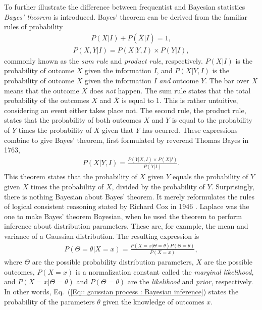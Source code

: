 \documentclass[twoside,english]{uiofysmaster}
\begin{document}
To further illustrate the difference between frequentist and Bayesian statistics \textit{Bayes' theorem} is introduced. Bayes' theorem can be derived from the familiar rules of probability
\begin{align}\label{Eq:: Sum rule}
P(X | I) + P(\bar{X} | I) = 1,
\end{align}
\begin{align}\label{Eq:: Product rule}
P(X, Y | I) = P(X | Y, I) \times P(Y | I),
\end{align} 
commonly known as the \textit{sum rule} and \textit{product rule}, respectively. $P(X|I)$ is the probability of outcome $X$ given the information $I$, and $P(X|Y,I)$ is the probability of outcome $X$ given the information $I$ \textit{and} outcome $Y$. The bar over $\bar{X}$ means that the outcome $X$ does \textit{not} happen. The sum rule states that the total probability of the outcomes $X$ and $\bar{X}$ is equal to 1. This is rather untuitive, considering an event either takes place not. The second rule, the product rule, states that the probability of both outcomes $X$ and $Y$ is equal to the probability of $Y$ times the probability of $X$ given that $Y$ has ocurred. These expressions combine to give Bayes' theorem, first formulated by reverend Thomas Bayes in 1763,
\begin{align}\label{Eq:: gaussian process : Bayes theorem}
P(X | Y, I) = \frac{P(Y | X, I) \times P(X | I)}{P(Y | I)}.
\end{align}
This theorem states that the probability of $X$ given $Y$ equals the probability of $Y$ given $X$ times the probability of $X$, divided by the probability of $Y$. Surprisingly, there is nothing Bayesian about Bayes' theorem. It merely reformulates the rules of logical consistent reasoning stated by Richard Cox in 1946 \cite{sivia2006data}. Laplace was the one to make Bayes' theorem Bayesian, when he used the theorem to perform inference about distribution parameters. These are, for example, the mean and variance of a Gaussian distribution. The resulting expression is
\begin{align}
P(\Theta = \theta | X=x) = \frac{P(X=x|\Theta = \theta) P(\Theta = \theta)}{P(X=x)},\label{Eq:: gaussian process : Bayesian inference}
\end{align}
where $\Theta$ are the possible probability distribution parameters, $X$ are the possible outcomes, $P(X=x)$ is a normalization constant called the \textit{marginal likelihood}, and $P(X=x|\Theta = \theta)$  and $P(\Theta = \theta)$ are the \textit{likelihood} and \textit{prior}, respectively. In other words, Eq.\ (\ref{Eq:: gaussian process : Bayesian inference}) states the probability of the parameters $\theta$ given the knowledge of outcomes $x$.
\end{document}
